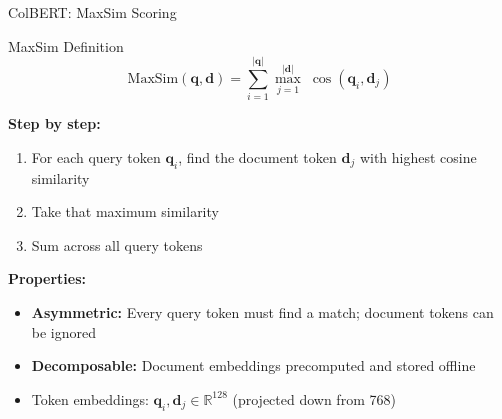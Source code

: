 \documentclass[aspectratio=169]{beamer}
\newif\ifanimated
\newcommand{\cpause}{\ifanimated\pause\fi}
\newcommand{\vq}{\mathbf{q}}
\newcommand{\vd}{\mathbf{d}}
\begin{document}
\begin{frame}{ColBERT: MaxSim Scoring}
\begin{block}{MaxSim Definition}
$$\text{MaxSim}(\vq, \vd) = \sum_{i=1}^{|\vq|} \max_{j=1}^{|\vd|}\; \cos(\vq_i, \vd_j)$$
\end{block}

\vspace{0.5em}

\textbf{Step by step:}
\begin{enumerate}
    \item For each query token $\vq_i$, find the document token $\vd_j$ with highest cosine similarity
    \item Take that maximum similarity
    \item Sum across all query tokens
\end{enumerate}

\cpause
\vspace{0.5em}

\textbf{Properties:}
\begin{itemize}
    \item \textbf{Asymmetric:} Every query token must find a match; document tokens can be ignored
    \item \textbf{Decomposable:} Document embeddings precomputed and stored offline
    \item Token embeddings: $\vq_i, \vd_j \in \mathbb{R}^{128}$ (projected down from 768)
\end{itemize}
\end{frame}
\end{document}
